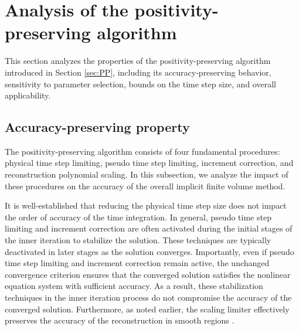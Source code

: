 \begingroup
\color{r2color}

\section{Analysis of the positivity-preserving algorithm}

This section analyzes the properties of the positivity-preserving algorithm introduced in Section \ref{sec:PP}, including its accuracy-preserving behavior, sensitivity to parameter selection, bounds on the time step size, and overall applicability.

\subsection{Accuracy-preserving property}

The positivity-preserving algorithm consists of four fundamental procedures: physical time step limiting, pseudo time step limiting, increment correction, and reconstruction polynomial scaling. In this subsection, we analyze the impact of these procedures on the accuracy of the overall implicit finite volume method.

It is well-established that reducing the physical time step size does not impact the order of accuracy of the time integration.
In general, pseudo time step limiting and increment correction are often activated during the initial stages of the inner iteration to stabilize the solution. These techniques are typically deactivated in later stages as the solution converges. Importantly, even if pseudo time step limiting and increment correction remain active, the unchanged convergence criterion ensures that the converged solution satisfies the nonlinear equation system with sufficient accuracy. As a result, these stabilization techniques in the inner iteration process do not compromise the accuracy of the converged solution.
Furthermore, as noted earlier, the scaling limiter effectively preserves the 
accuracy of the reconstruction in smooth regions \cite{zhang2010positivity}.

